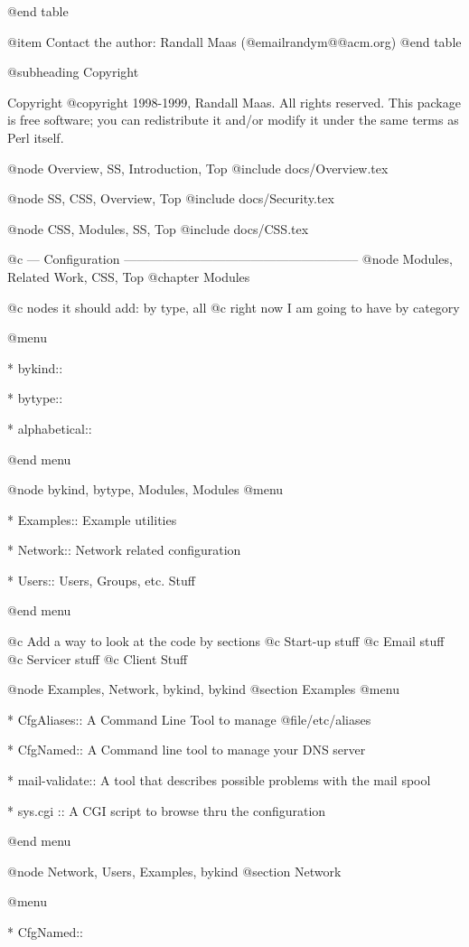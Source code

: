 @end table

@item Contact the author:
Randall Maas (@email{randym@@acm.org})
@end table

@subheading Copyright

Copyright @copyright{} 1998-1999, Randall Maas. All rights reserved.  This
package is free software; you can redistribute it and/or modify it
under the same terms as Perl itself.

@node Overview, SS, Introduction, Top
@include docs/Overview.tex

@node SS, CSS, Overview, Top
@include docs/Security.tex

@node CSS, Modules, SS, Top
@include docs/CSS.tex

@c --- Configuration --------------------------------------------------------
@node Modules, Related Work, CSS, Top
@chapter Modules

@c nodes it should add: by type, all
@c right now I am going to have by category

@menu

* bykind::

* bytype::

* alphabetical::

@end menu

@node bykind, bytype, Modules, Modules
@menu

* Examples:: Example utilities

* Network::  Network related configuration

* Users::    Users, Groups, etc. Stuff

@end menu

@c Add a way to look at the code by sections
@c Start-up stuff
@c Email stuff
@c Servicer stuff
@c Client Stuff


@node Examples, Network, bykind, bykind
@section Examples
@menu

* CfgAliases:: A Command Line Tool to manage @file{/etc/aliases}

* CfgNamed:: A Command line tool to manage your DNS server

* mail-validate:: A tool that describes possible problems with the mail spool

* sys.cgi :: A CGI script to browse thru the configuration

@end menu

@node Network, Users, Examples, bykind
@section Network

@menu

* CfgNamed::	

